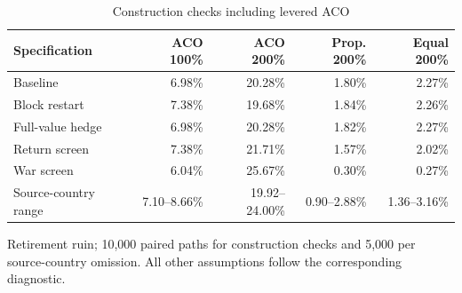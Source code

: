 \begin{table}[H]
\centering\small
\caption{Construction checks including levered ACO}\label{tab:aco-methods}
\begin{tabular}{lrrrr}\toprule
Specification & ACO 100\% & ACO 200\% & Prop. 200\% & Equal 200\% \\
\midrule
Baseline & 6.98\% & 20.28\% & 1.80\% & 2.27\% \\
Block restart & 7.38\% & 19.68\% & 1.84\% & 2.26\% \\
Full-value hedge & 6.98\% & 20.28\% & 1.82\% & 2.27\% \\
Return screen & 7.38\% & 21.71\% & 1.57\% & 2.02\% \\
War screen & 6.04\% & 25.67\% & 0.30\% & 0.27\% \\
Source-country range & 7.10--8.66\% & 19.92--24.00\% & 0.90--2.88\% & 1.36--3.16\% \\
\bottomrule\end{tabular}
\par\smallskip\begin{minipage}{0.96\textwidth}\footnotesize
Retirement ruin; 10,000 paired paths for construction checks and 5,000 per source-country omission. All other assumptions follow the corresponding diagnostic.
\end{minipage}\end{table}
